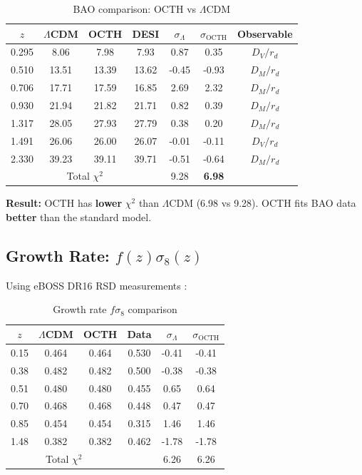 \documentclass[12pt,a4paper]{article}
\begin{document}
\begin{table}[H]
\centering
\caption{BAO comparison: OCTH vs $\Lambda$CDM}
\begin{tabular}{ccccccc}
\toprule
$z$ & $\Lambda$CDM & OCTH & DESI & $\sigma_{\Lambda}$ & $\sigma_{\text{OCTH}}$ & Observable \\
\midrule
0.295 & 8.06 & 7.98 & 7.93 & 0.87 & 0.35 & $D_V/r_d$ \\
0.510 & 13.51 & 13.39 & 13.62 & -0.45 & -0.93 & $D_M/r_d$ \\
0.706 & 17.71 & 17.59 & 16.85 & 2.69 & 2.32 & $D_M/r_d$ \\
0.930 & 21.94 & 21.82 & 21.71 & 0.82 & 0.39 & $D_M/r_d$ \\
1.317 & 28.05 & 27.93 & 27.79 & 0.38 & 0.20 & $D_M/r_d$ \\
1.491 & 26.06 & 26.00 & 26.07 & -0.01 & -0.11 & $D_V/r_d$ \\
2.330 & 39.23 & 39.11 & 39.71 & -0.51 & -0.64 & $D_M/r_d$ \\
\midrule
\multicolumn{4}{c}{Total $\chi^2$} & 9.28 & \textbf{6.98} & \\
\bottomrule
\end{tabular}
\label{tab:bao}
\end{table}

\textbf{Result:} OCTH has \textbf{lower} $\chi^2$ than $\Lambda$CDM (6.98 vs 9.28). OCTH fits BAO data \textbf{better} than the standard model.

\subsection{Growth Rate: $f(z)\sigma_8(z)$}

Using eBOSS DR16 RSD measurements \citep{eBOSS2020}:

\begin{table}[H]
\centering
\caption{Growth rate $f\sigma_8$ comparison}
\begin{tabular}{cccccc}
\toprule
$z$ & $\Lambda$CDM & OCTH & Data & $\sigma_{\Lambda}$ & $\sigma_{\text{OCTH}}$ \\
\midrule
0.15 & 0.464 & 0.464 & 0.530 & -0.41 & -0.41 \\
0.38 & 0.482 & 0.482 & 0.500 & -0.38 & -0.38 \\
0.51 & 0.480 & 0.480 & 0.455 & 0.65 & 0.64 \\
0.70 & 0.468 & 0.468 & 0.448 & 0.47 & 0.47 \\
0.85 & 0.454 & 0.454 & 0.315 & 1.46 & 1.46 \\
1.48 & 0.382 & 0.382 & 0.462 & -1.78 & -1.78 \\
\midrule
\multicolumn{3}{c}{Total $\chi^2$} & & 6.26 & 6.26 \\
\bottomrule
\end{tabular}
\label{tab:fsigma8}
\end{table}
\end{document}
